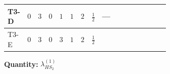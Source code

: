 \documentclass[8pt]{article}
\begin{document}
\begin{landscape}
\begin{longtable}{@{}llcccccc >{\raggedright\arraybackslash}p{0.21\linewidth} >{\raggedright\arraybackslash}p{0.21\linewidth} >{\raggedright\arraybackslash}p{0.21\linewidth}@{}}
\midrule
T3-D & $0$ & $3$ & $0$ & $1$ & $1$ & $2$ & $\frac{1}{2}$ & --- & \scriptsize\adjustbox{max width=\linewidth}{$\begin{gathered} -\frac{9 {g_2}^2 {\lambda_{HS_2}^{(1)}}}{2}\end{gathered}$} & \scriptsize\adjustbox{max width=\linewidth}{$\begin{gathered} +3 {g_1}^4\end{gathered}$} \\
\midrule
T3-E & $0$ & $3$ & $0$ & $3$ & $1$ & $2$ & $\frac{1}{2}$ & \scriptsize\adjustbox{max width=\linewidth}{$\begin{gathered} +6 {g_2}^4\end{gathered}$} & \scriptsize\adjustbox{max width=\linewidth}{$\begin{gathered} -\frac{33 {g_2}^2 {\lambda_{HS_2}^{(1)}}}{2}\end{gathered}$} & \scriptsize\adjustbox{max width=\linewidth}{$\begin{gathered} +3 {g_1}^4\end{gathered}$} \\
\midrule
\bottomrule
\end{longtable}
\clearpage
\noindent\textbf{Quantity: }$\lambda_{HS_2}^{(1)}$\par\smallskip

\end{landscape}
\end{document}
